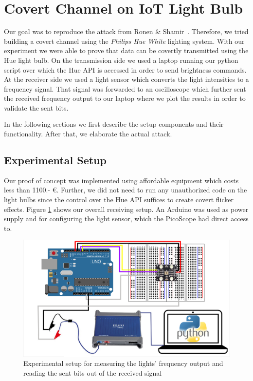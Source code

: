 \section{Covert Channel on IoT Light Bulb} %
\label{sec:experiment}
Our goal was to reproduce the attack from Ronen \& Shamir~\cite{Ronen:2016:EFAIDCSL}.
Therefore, we tried building a covert channel using the \textit{Philips Hue White} lighting system. With our experiment we were able to prove that data can be covertly transmitted using the Hue light bulb. 
On the transmission side we used a laptop running our python script over which the Hue API is accessed in order to send brightness commands.
At the receiver side we used a light sensor which converts the light intensities to a frequency signal. That signal was forwarded to an oscilloscope which further sent the received frequency output to our laptop where we plot the results in order to validate the sent bits.

In the following sections we first describe the setup components and their functionality. After that, we elaborate the actual attack.\newline

\subsection{Experimental Setup} %
\label{sec:setup}


Our proof of concept was implemented using affordable equipment which costs less than 1100.- €. Further, we did not need to run any unauthorized code on the light bulbs since the control over the Hue API suffices to create covert flicker effects. 
Figure \ref{fig:setup} shows our overall receiving setup. An Arduino was used as power supply and for configuring the light sensor, which the PicoScope had direct access to.
\begin{figure}[h]
	\centering
	\includegraphics[width=14cm]{img/experimental-setup_overview.png}
	\caption{Experimental setup for measuring the lights' frequency output and reading the sent bits out of the received signal}
	\label{fig:setup}
\end{figure}

